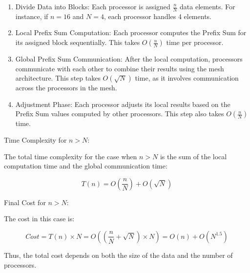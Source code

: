 \documentclass[a4paper,10pt]{article}
\begin{document}
    \begin{enumerate}
        
        \item Divide Data into Blocks: Each processor is assigned $\frac{n}{N}$ data elements. For instance, if $n=16$ and $N=4$, each processor handles 4 elements.
        
        \item Local Prefix Sum Computation: Each processor computes the Prefix Sum for its assigned block sequentially. This takes $O(\frac{n}{N})$ time per processor.
        
        \item Global Prefix Sum Communication: After the local computation, processors communicate with each other to combine their results using the mesh architecture. This step takes $O(\sqrt{N})$ time, as it involves communication across the processors in the mesh.
        
        \item Adjustment Phase: Each processor adjusts its local results based on the Prefix Sum values computed by other processors. This step also takes $O(\frac{n}{N})$ time.

    \end{enumerate}

    {\bold Time Complexity for $n > N$:}

    The total time complexity for the case when $n > N$ is the sum of the local computation time and the global communication time:

    $$T(n) = O(\frac{n}{N}) + O(\sqrt{N})$$


    {\bold Final Cost for $n > N$:}

    The cost in this case is:

    $$Cost = T(n) \times N = O((\frac{n}{N} + \sqrt{N}) \times N) = O(n) + O(N^{1.5})$$

    Thus, the total cost depends on both the size of the data and the number of processors.
\end{document}
